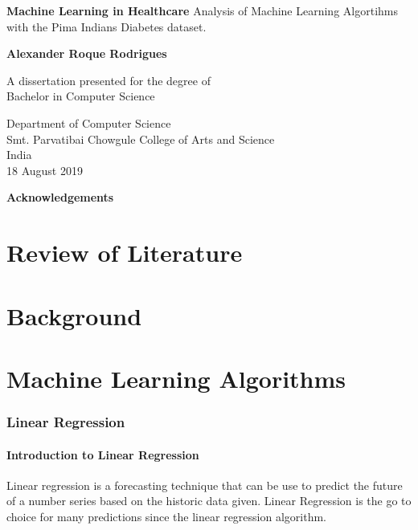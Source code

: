 \documentclass[12pt]{article}
\begin{document}
\begin{titlepage}
    \begin{center}
        \vspace*{1cm} 
        \Huge
        \textbf{Machine Learning in Healthcare} 
        \vspace{0.5cm}
        \normalsize
        \vspace{0cm}
        Analysis of Machine Learning Algortihms with the Pima Indians Diabetes dataset.
 
        \vspace{1.5cm}
 
        \textbf{Alexander Roque Rodrigues}
 
        \vfill
 
        A dissertation presented for the degree of\\
        Bachelor in Computer Science
 
        \vspace{0.8cm}
  
        \Large
        Department of Computer Science\\        
        Smt. Parvatibai Chowgule College of Arts and Science\\
        India\\
        18 August 2019
 
    \end{center}
\end{titlepage}
\Huge
\newpage
\huge
\textbf{Acknowledgements}
\normalsize
\newpage
\tableofcontents
\newpage
\part{Review of Literature}
\newpage
\part{Background}
\newpage
\part{Machine Learning Algorithms}
\newpage
\section{Linear Regression}
\subsection{Introduction to Linear Regression}
Linear regression is a forecasting technique that can be use to predict the future of a number series based on the historic data given. Linear Regression is the go to choice for many predictions since the linear regression algorithm.
\end{document}
